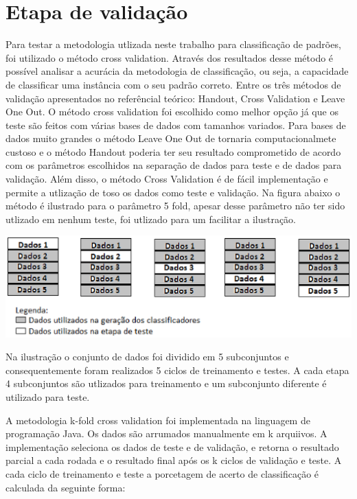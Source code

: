 \section{Etapa de validação}
Para testar a metodologia utlizada neste trabalho para classificação de padrões, foi utilizado o método cross validation. Através dos resultados desse método é possível analisar a acurácia da metodologia de classificação, ou seja, a capacidade de classificar uma instância com o seu padrão correto.
Entre os três métodos de validação apresentados no referêncial teórico: Handout, Cross Validation e Leave One Out. O método cross validation foi escolhido como melhor opção já que os teste são feitos com várias bases de dados com tamanhos variados. Para bases de dados muito grandes o método Leave One Out de tornaria computacionalmete custoso e o método Handout poderia ter seu resultado comprometido de acordo com os parâmetros escolhidos na separação de dados para teste e de dados para validação. Além disso, o método Cross Validation é de fácil implementação e permite a utlização de toso os dados como teste e validação.
Na figura abaixo o método é ilustrado para o parâmetro 5 fold, apesar desse parâmetro não ter sido utlizado em nenhum teste, foi utlizado para um facilitar a ilustração.
\begin{center}
	\includegraphics[scale=1.0]{graficos/cross_validation}
	\label{img:cross_validation}
\end{center}

Na ilustração o conjunto de dados foi dividido em 5 subconjuntos e consequentemente foram realizados 5 ciclos de treinamento e testes. A cada etapa 4 subconjuntos são utlizados para treinamento e um subconjunto diferente é utilizado para teste. 

A metodologia k-fold cross validation foi implementada na linguagem de programação Java. Os dados são arrumados manualmente em k arquiivos. A implementação seleciona os dados de teste e de validação, e retorna o resultado parcial a cada rodada e o resultado final após os k ciclos de validação e teste. A cada ciclo de treinamento e teste a porcetagem de acerto de classificação é calculada da seguinte forma:

